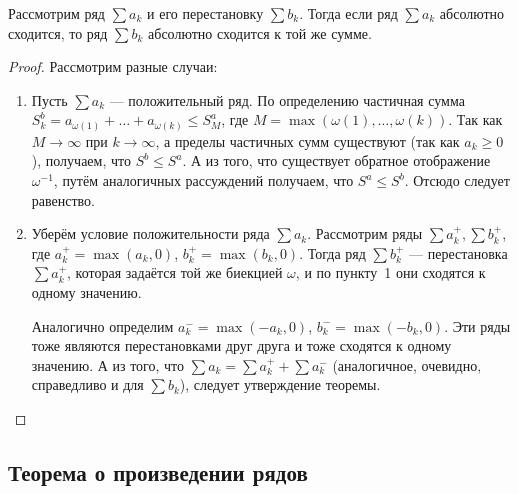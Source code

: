 \begin{theorem} \hypertarget{теорема о перестановке слагаемых}{}
	Рассмотрим ряд \(\sum a_k\) и его перестановку \(\sum b_k\). Тогда если ряд \(\sum a_k\) абсолютно сходится, то ряд \(\sum b_k\) абсолютно сходится к той же сумме.
\end{theorem}
\begin{proof}
	Рассмотрим разные случаи:
	\begin{enumerate}
		\item Пусть \(\sum a_k\) --- положительный ряд. По определению частичная сумма \(S_k^b = a_{\omega(1)} + \ldots + a_{\omega(k)} \leqslant S_M^a\), где \(M = \max (\omega(1), \ldots, \omega(k))\). Так как \(M \to \infty\) при \(k \to \infty\), а пределы частичных сумм существуют (так как \(a_k \geqslant 0\)), получаем, что \(S^b \leqslant S^a\). А из того, что существует обратное отображение \(\omega^{-1}\), путём аналогичных рассуждений получаем, что \(S^a \leqslant S^b\). Отсюдо следует равенство.
		\item Уберём условие положительности ряда \(\sum a_k\). Рассмотрим ряды \linebreak \(\sum a_k^+, \sum b_k^+\), где \(a_k^+ = \max (a_k, 0)\), \(b_k^+ = \max (b_k, 0)\). Тогда ряд \(\sum b_k^+\) --- перестановка \(\sum a_k^+\), которая задаётся той же биекцией \(\omega\), и по пункту~1 они сходятся к одному значению. 
		
		Аналогично определим \(a_k^- = \max (-a_k, 0)\), \(b_k^- = \max (-b_k, 0)\). Эти ряды тоже являются перестановками друг друга и тоже сходятся к одному значению. А из того, что \(\sum a_k = \sum a_k^+ +\sum a_k^-\) (аналогичное, очевидно, справедливо и для \(\sum b_k\)), следует утверждение теоремы.
	\end{enumerate}
\end{proof}

\subsection{Теорема о произведении рядов}

